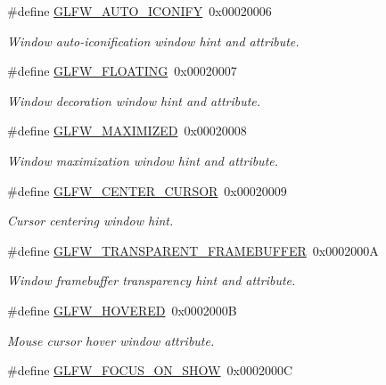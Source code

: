 \begin{DoxyCompactItemize}
\#define \mbox{\hyperlink{group__window_ga9d9874fc928200136a6dcdad726aa252}{G\+L\+F\+W\+\_\+\+A\+U\+T\+O\+\_\+\+I\+C\+O\+N\+I\+FY}}~0x00020006
\begin{DoxyCompactList}\small\item\em Window auto-\/iconification window hint and attribute. \end{DoxyCompactList}\item 
\#define \mbox{\hyperlink{group__window_ga7fb0be51407783b41adbf5bec0b09d80}{G\+L\+F\+W\+\_\+\+F\+L\+O\+A\+T\+I\+NG}}~0x00020007
\begin{DoxyCompactList}\small\item\em Window decoration window hint and attribute. \end{DoxyCompactList}\item 
\#define \mbox{\hyperlink{group__window_gad8ccb396253ad0b72c6d4c917eb38a03}{G\+L\+F\+W\+\_\+\+M\+A\+X\+I\+M\+I\+Z\+ED}}~0x00020008
\begin{DoxyCompactList}\small\item\em Window maximization window hint and attribute. \end{DoxyCompactList}\item 
\#define \mbox{\hyperlink{group__window_ga5ac0847c0aa0b3619f2855707b8a7a77}{G\+L\+F\+W\+\_\+\+C\+E\+N\+T\+E\+R\+\_\+\+C\+U\+R\+S\+OR}}~0x00020009
\begin{DoxyCompactList}\small\item\em Cursor centering window hint. \end{DoxyCompactList}\item 
\#define \mbox{\hyperlink{group__window_ga60a0578c3b9449027d683a9c6abb9f14}{G\+L\+F\+W\+\_\+\+T\+R\+A\+N\+S\+P\+A\+R\+E\+N\+T\+\_\+\+F\+R\+A\+M\+E\+B\+U\+F\+F\+ER}}~0x0002000A
\begin{DoxyCompactList}\small\item\em Window framebuffer transparency hint and attribute. \end{DoxyCompactList}\item 
\#define \mbox{\hyperlink{group__window_ga8665c71c6fa3d22425c6a0e8a3f89d8a}{G\+L\+F\+W\+\_\+\+H\+O\+V\+E\+R\+ED}}~0x0002000B
\begin{DoxyCompactList}\small\item\em Mouse cursor hover window attribute. \end{DoxyCompactList}\item 
\#define \mbox{\hyperlink{group__window_gafa94b1da34bfd6488c0d709761504dfc}{G\+L\+F\+W\+\_\+\+F\+O\+C\+U\+S\+\_\+\+O\+N\+\_\+\+S\+H\+OW}}~0x0002000C

\end{DoxyCompactItemize}

